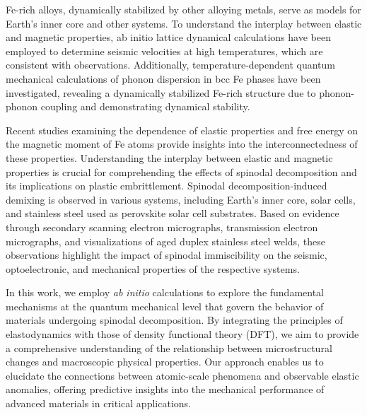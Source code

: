 
Fe-rich alloys, dynamically stabilized by other alloying metals, serve as models for Earth's inner core and other systems. To understand the interplay between elastic and magnetic properties, ab initio lattice dynamical calculations have been employed to determine seismic velocities at high temperatures, which are consistent with observations. \cite{dziewonski1981preliminary, oganov2004theoretical,karato1998seismic, wentzcovitch2010first,kadas2011thermo, euroresearchcouncil2014} Additionally, temperature-dependent quantum mechanical calculations of phonon dispersion in bcc Fe phases have been investigated, revealing a dynamically stabilized Fe-rich structure due to phonon-phonon coupling and demonstrating dynamical stability.

Recent studies examining the dependence of elastic properties and free energy on the magnetic moment of Fe atoms provide insights into the interconnectedness of these properties. Understanding the interplay between elastic and magnetic properties is crucial for comprehending the effects of spinodal decomposition and its implications on plastic embrittlement. Spinodal decomposition-induced demixing is observed in various systems, including Earth's inner core, solar cells, and stainless steel used as perovskite solar cell substrates. Based on evidence through secondary scanning electron micrographs, transmission electron micrographs, and visualizations of aged duplex stainless steel welds, these observations highlight the impact of spinodal immiscibility on the seismic, optoelectronic, and mechanical properties of the respective systems.













In this work, we employ \emph{ab initio} calculations to explore the fundamental mechanisms at the quantum mechanical level that govern the behavior of materials undergoing spinodal decomposition. By integrating the principles of elastodynamics with those of density functional theory (DFT), we aim to provide a comprehensive understanding of the relationship between microstructural changes and macroscopic physical properties. Our approach enables us to elucidate the connections between atomic-scale phenomena and observable elastic anomalies, offering predictive insights into the mechanical performance of advanced materials in critical applications.